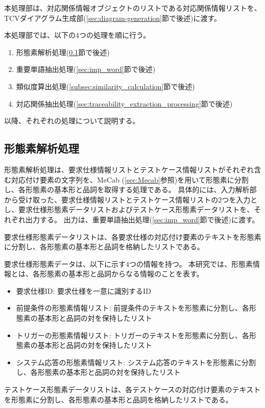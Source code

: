 本処理部は、対応関係情報オブジェクトのリストである対応関係情報リストを、TCVダイアグラム生成部(\ref{sec:diagram-generation}節で後述)に渡す。

本処理部では、以下の$4$つの処理を順に行う。
\begin{enumerate}
    \item 形態素解析処理(\cref{sec:morphological_analysis}節で後述)
    \item 重要単語抽出処理(\cref{sec:imp_word}節で後述)
    \item 類似度算出処理(\cref{subsec:similarity_calculation}節で後述)
    \item 対応関係抽出処理(\cref{sec:traceability_extraction_processing}節で後述)
\end{enumerate}
以降、それぞれの処理について説明する。

\subsection{形態素解析処理}\label{sec:morphological_analysis}
形態素解析処理は、要求仕様情報リストとテストケース情報リストがそれぞれ含む対応付け要素の文字列を、MeCab (\cref{sec:Mecab}参照)を用いて形態素に分割し、各形態素の基本形と品詞を取得する処理である。
具体的には、入力解析部から受け取った、要求仕様情報リストとテストケース情報リストの2つを入力とし、要求仕様形態素データリストおよびテストケース形態素データリストを、それぞれ出力する。
出力は、重要単語抽出処理(\ref{sec:imp_word}節で後述)に渡す。

要求仕様形態素データリストは、各要求仕様の対応付け要素のテキストを形態素に分割し、各形態素の基本形と品詞を格納したリストである。

要求仕様形態素データは、以下に示す$4$つの情報を持つ。
本研究では、形態素情報とは、各形態素の基本形と品詞からなる情報のことを表す。
\begin{itemize}
    \item 要求仕様ID: 要求仕様を一意に識別するID
    \item 前提条件の形態素情報リスト: 前提条件のテキストを形態素に分割し、各形態素の基本形と品詞の対を保持したリスト
    \item トリガーの形態素情報リスト: トリガーのテキストを形態素に分割し、各形態素の基本形と品詞の対を保持したリスト
    \item システム応答の形態素情報リスト: システム応答のテキストを形態素に分割し、各形態素の基本形と品詞の対を保持したリスト
\end{itemize}

テストケース形態素データリストは、各テストケースの対応付け要素のテキストを形態素に分割し、各形態素の基本形と品詞を格納したリストである。

